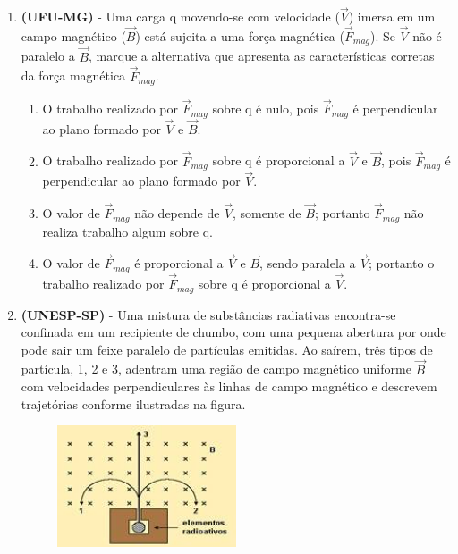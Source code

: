 \documentclass[12pt,letterpaper,fleqn]{article}
\begin{document}
\begin{itemize}
\begin{enumerate}
            \item \textbf{(UFU-MG)} - Uma carga q movendo-se com velocidade ($\vec{V}$) imersa em um campo magnético ($\vec{B}$) está sujeita a uma força magnética ($\vec{F}_{mag}$). Se $\vec{V}$ não é paralelo a $\vec{B}$, marque a alternativa que apresenta as características corretas da força magnética $\vec{F}_{mag}$.
            
            \begin{enumerate}
                \item O trabalho realizado por $\vec{F}_{mag}$ sobre q é nulo, pois $\vec{F}_{mag}$ é perpendicular ao plano formado por $\vec{V}$ e $\vec{B}$.
                \item O trabalho realizado por $\vec{F}_{mag}$ sobre q é proporcional a $\vec{V}$ e $\vec{B}$, pois $\vec{F}_{mag}$ é perpendicular ao plano formado por $\vec{V}$.
                \item O valor de $\vec{F}_{mag}$ não depende de $\vec{V}$, somente de $\vec{B}$; portanto $\vec{F}_{mag}$ não realiza trabalho algum sobre q.
                \item O valor de $\vec{F}_{mag}$ é proporcional a $\vec{V}$ e $\vec{B}$, sendo paralela a $\vec{V}$; portanto o trabalho realizado por $\vec{F}_{mag}$ sobre q é proporcional a $\vec{V}$.
            \end{enumerate}
            
            \item \textbf{(UNESP-SP)} - Uma mistura de substâncias radiativas encontra-se confinada em um recipiente de chumbo, com uma pequena abertura por onde pode sair um feixe paralelo de partículas emitidas. Ao saírem, três tipos de partícula, 1, 2 e 3, adentram uma região de campo magnético uniforme $\vec{B}$ com velocidades perpendiculares às linhas de campo magnético e descrevem trajetórias conforme ilustradas na figura.
            
            \begin{figure}[h]
                \centering
                \includegraphics[width=0.5\textwidth]{ex_4_forca.jpg}
            \end{figure}
            

\end{enumerate}
\end{itemize}
\end{document}
